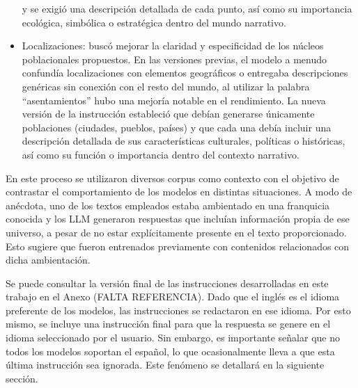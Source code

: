 \begin{itemize}
y se exigió una descripción detallada de cada punto, así como su importancia ecológica,
simbólica o estratégica dentro del mundo narrativo.
\item Localizaciones:
buscó mejorar la claridad y especificidad de los núcleos poblacionales propuestos.
En las versiones previas, el modelo a menudo confundía localizaciones con elementos geográficos
o entregaba descripciones genéricas sin conexión con el resto del mundo,
al utilizar la palabra ``asentamientos'' hubo una mejoría notable en el rendimiento.
La nueva versión de la instrucción estableció que debían generarse únicamente poblaciones (ciudades, pueblos, países)
y que cada una debía incluir una descripción detallada de sus características culturales, políticas o históricas,
así como su función o importancia dentro del contexto narrativo.
\end{itemize}

\pagebreak
En este proceso se utilizaron diversos corpus como contexto
con el objetivo de contrastar el comportamiento de los modelos en distintas situaciones.
A modo de anécdota, uno de los textos empleados estaba ambientado en una franquicia conocida
y los LLM generaron respuestas que incluían información propia de ese universo,
a pesar de no estar explícitamente presente en el texto proporcionado.
Esto sugiere que fueron entrenados previamente con contenidos relacionados con dicha ambientación.

Se puede consultar la versión final de las instrucciones desarrolladas en este trabajo en el Anexo (FALTA REFERENCIA).
Dado que el inglés es el idioma preferente de los modelos,
las instrucciones se redactaron en ese idioma.
Por esto mismo, se incluye una instrucción final para que la respuesta se genere en el idioma seleccionado por el usuario.
Sin embargo, es importante señalar que no todos los modelos soportan el español,
lo que ocasionalmente lleva a que esta última instrucción sea ignorada.
Este fenómeno se detallará en la siguiente sección.